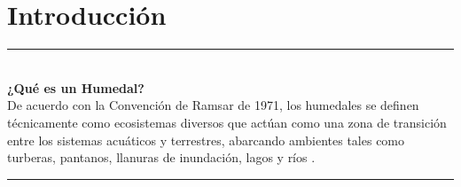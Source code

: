 
\section{Introducción}

\begin{frame}[plain]
  \hspace{0.8cm}%
  \begin{minipage}{0.88\textwidth}
    \vspace{2.2cm}
    {\color{ColorAcento}\rule{0.5\textwidth}{1.2pt}}\\[0.5cm]
    {\large\bfseries\color{ColorPrincipal}
      ¿Qué es un Humedal?}\\[0.6cm]
    {\normalsize\color{black}
      De acuerdo con la Convención de Ramsar de 1971, los humedales se definen técnicamente 
      como ecosistemas diversos que actúan como una zona de transición entre los sistemas acuáticos y terrestres, 
      abarcando ambientes tales como turberas, pantanos, llanuras de inundación, lagos y ríos \cite{vergara2024humedales}.
    }\\[0.5cm]
    {\color{ColorAcento}\rule{0.3\textwidth}{0.8pt}}
    \vfill
  \end{minipage}
\end{frame}

